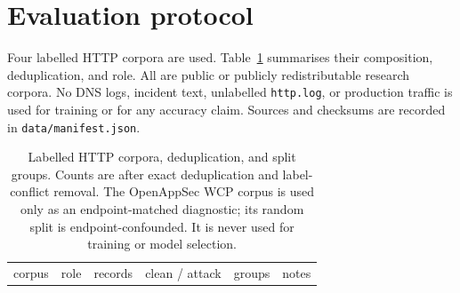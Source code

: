 \documentclass[preprint,11pt]{elsarticle}
\begin{document}
\section{Evaluation protocol}\label{evaluation-protocol}

Four labelled HTTP corpora are used. Table~\ref{tab:corpora} summarises their
composition, deduplication, and role. All are public or publicly
redistributable research corpora. No DNS logs, incident text, unlabelled
\texttt{http.\allowbreak{}log}, or production traffic is used for training or for any
accuracy claim. Sources and checksums are recorded in
\texttt{data/\allowbreak{}manifest.\allowbreak{}json}.



{
\begingroup\footnotesize\setlength{\tabcolsep}{3pt}
\begin{longtable}[]{@{}
  >{\raggedright\arraybackslash}p{}
  >{\raggedright\arraybackslash}p{}
  >{\raggedleft\arraybackslash}p{}
  >{\raggedleft\arraybackslash}p{}
  >{\raggedright\arraybackslash}p{}
  >{\raggedright\arraybackslash}p{}@{}}
\caption{Labelled HTTP corpora, deduplication, and split groups.
Counts are after exact deduplication and label-conflict removal. The
OpenAppSec WCP corpus is used only as an endpoint-matched diagnostic;
its random split is endpoint-confounded. It is never used for training
or model selection.}\label{tab:corpora}\\
\toprule\noalign{}
\begin{minipage}[t]{\linewidth}\raggedright
corpus
\end{minipage} & \begin{minipage}[t]{\linewidth}\raggedright
role
\end{minipage} & \begin{minipage}[t]{\linewidth}\raggedleft
records
\end{minipage} & \begin{minipage}[t]{\linewidth}\raggedleft
clean / attack
\end{minipage} & \begin{minipage}[t]{\linewidth}\raggedleft
groups
\end{minipage} & \begin{minipage}[t]{\linewidth}\raggedright
notes
\end{minipage} \\

\end{longtable}}
\end{document}
